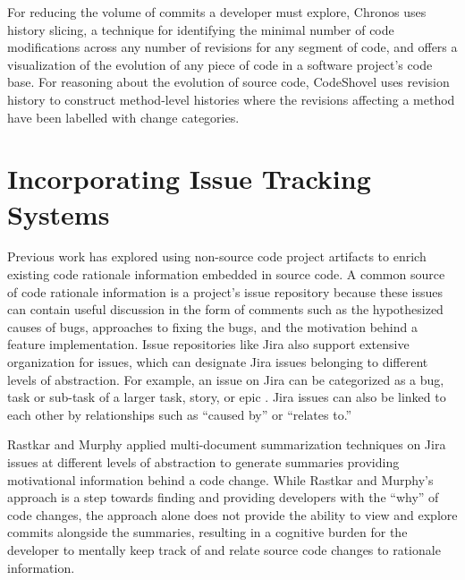 For reducing the volume of commits a developer must explore, Chronos \cite{servant_history_2012} uses history slicing, 
a technique for identifying the minimal number of code modifications across any number of revisions for any segment of code, 
and offers a visualization of the evolution of any piece of code in a software project's code base.
For reasoning about the evolution of source code, CodeShovel \cite{grund_codeshovel_2021} 
uses revision history to construct method-level histories where the revisions affecting a 
method have been labelled with change categories.


\section{Incorporating Issue Tracking Systems}

Previous work has explored using non-source code project artifacts to enrich existing code 
rationale information embedded in source code. 
A common source of code rationale information is a project's issue repository because these 
issues can contain useful discussion in the form of comments such as the hypothesized causes of bugs, 
approaches to fixing the bugs, and the motivation behind a feature implementation. 
Issue repositories like Jira also support extensive organization for issues,
which can designate Jira issues belonging to different levels of abstraction.
For example, an issue on Jira can be categorized as a bug, task or sub-task of a larger task, story, or epic \cite{jira-issue-types}.
Jira issues can also be linked to each other by relationships such as ``caused by'' or ``relates to.''

Rastkar and Murphy \cite{rastkar_why_2013} applied multi-document summarization techniques on Jira issues 
at different levels of abstraction to generate summaries providing motivational information behind a code change.
While Rastkar and Murphy's approach is a step towards finding and providing developers with the ``why'' of code changes, 
the approach alone does not provide the ability to view and explore commits alongside the summaries,
resulting in a cognitive burden for the developer to mentally 
keep track of and relate source code changes to rationale information.


